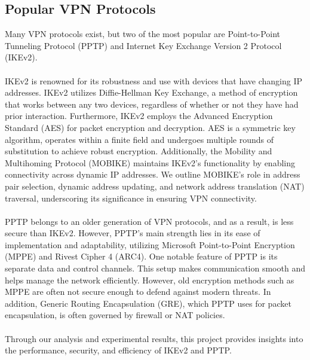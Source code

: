 \documentclass[runningheads]{llncs}
\begin{document}
\subsection{Popular VPN Protocols}
Many VPN protocols exist, but two of the most popular are Point-to-Point Tunneling Protocol (PPTP) and Internet Key Exchange Version 2 Protocol (IKEv2).\\
\\
IKEv2 is renowned for its robustness and use with devices that have changing IP addresses. IKEv2 utilizes Diffie-Hellman Key Exchange, a method of encryption that works between any two devices, regardless of whether or not they have had prior interaction. Furthermore, IKEv2 employs the Advanced Encryption Standard (AES) for packet encryption and decryption. AES is a symmetric key algorithm, operates within a finite field and undergoes multiple rounds of substitution to achieve robust encryption. Additionally, the Mobility and Multihoming Protocol (MOBIKE) maintains IKEv2's functionality by enabling connectivity across dynamic IP addresses. We outline MOBIKE's role in address pair selection, dynamic address updating, and network address translation (NAT) traversal, underscoring its significance in ensuring VPN connectivity.\\
\\
PPTP belongs to an older generation of VPN protocols, and as a result, is less secure than IKEv2. However, PPTP's main strength lies in its ease of implementation and adaptability, utilizing Microsoft Point-to-Point Encryption (MPPE) and Rivest Cipher 4 (ARC4). One notable feature of PPTP is its separate data and control channels. This setup makes communication smooth and helps manage the network efficiently. However, old encryption methods such as MPPE are often not secure enough to defend against modern threats. In addition, Generic Routing Encapsulation (GRE), which PPTP uses for packet encapsulation, is often governed by firewall or NAT policies.\\
\\
Through our analysis and experimental results, this project provides insights into the performance, security, and efficiency of IKEv2 and PPTP. 
\end{document}
